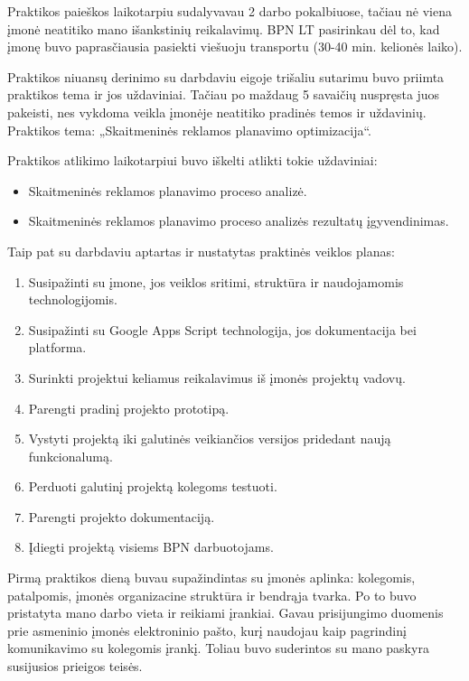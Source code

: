 \documentclass{VUMIFPSkursinis}
\begin{document}
Praktikos paieškos laikotarpiu sudalyvavau 2 darbo pokalbiuose, tačiau nė viena įmonė neatitiko mano išankstinių reikalavimų. BPN LT pasirinkau dėl to, kad įmonę buvo paprasčiausia pasiekti viešuoju transportu (30-40 min. kelionės laiko).

Praktikos niuansų derinimo su darbdaviu eigoje trišaliu sutarimu buvo priimta praktikos tema ir jos uždaviniai. Tačiau po maždaug 5 savaičių nuspręsta juos pakeisti, nes vykdoma veikla įmonėje neatitiko pradinės temos ir uždavinių. Praktikos tema: „Skaitmeninės reklamos planavimo optimizacija“.

Praktikos atlikimo laikotarpiui buvo iškelti atlikti tokie uždaviniai:
\begin{itemize}
    \item Skaitmeninės reklamos planavimo proceso analizė.
    \item Skaitmeninės reklamos planavimo proceso analizės rezultatų įgyvendinimas.
\end{itemize}
\bigskip

Taip pat su darbdaviu aptartas ir nustatytas praktinės veiklos planas:
\begin{enumerate}
    \item Susipažinti su įmone, jos veiklos sritimi, struktūra ir naudojamomis technologijomis.
    \item Susipažinti su Google Apps Script technologija, jos dokumentacija bei platforma.
    \item Surinkti projektui keliamus reikalavimus iš įmonės projektų vadovų.
    \item Parengti pradinį projekto prototipą.
    \item Vystyti projektą iki galutinės veikiančios versijos pridedant naują funkcionalumą.
    \item Perduoti galutinį projektą kolegoms testuoti.
    \item Parengti projekto dokumentaciją.
    \item Įdiegti projektą visiems BPN darbuotojams.
\end{enumerate}
\bigskip

Pirmą praktikos dieną buvau supažindintas su įmonės aplinka: kolegomis, patalpomis, įmonės organizacine struktūra ir bendrąja tvarka. Po to buvo pristatyta mano darbo vieta ir reikiami įrankiai. Gavau prisijungimo duomenis prie asmeninio įmonės elektroninio pašto, kurį naudojau kaip pagrindinį komunikavimo su kolegomis įrankį. Toliau buvo suderintos su mano paskyra susijusios prieigos teisės.
\end{document}
